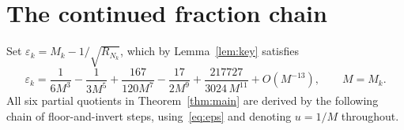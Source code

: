 \documentclass[10pt,a4paper]{amsart}
\begin{document}
\section{The continued fraction chain}\label{sec:chain}

Set $\varepsilon_k = M_k - 1/\sqrt{R_{N_k}}$, which by
Lemma~\ref{lem:key} satisfies
\begin{equation}\label{eq:eps}
  \varepsilon_k = \frac{1}{6M^3} - \frac{1}{3M^5} + \frac{167}{120M^7}
                - \frac{17}{2M^9} + \frac{217727}{3024\,M^{11}} + O(M^{-13}),
  \qquad M = M_k.
\end{equation}
All six partial quotients in Theorem~\ref{thm:main} are derived by
the following chain of floor-and-invert steps, using~\eqref{eq:eps} and
denoting $u = 1/M$ throughout.
\end{document}
